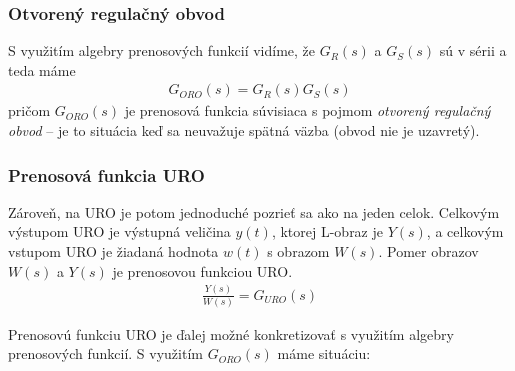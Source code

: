 \documentclass[a4paper, 10pt, ]{article}
\begin{document}
\subsubsection{Otvorený regulačný obvod}

S využitím algebry prenosových funkcií vidíme, že $G_R(s)$ a $G_S(s)$ sú v sérii a teda máme
\begin{align}
    G_{ORO}(s) = G_R(s) G_S(s)
\end{align}
pričom $G_{ORO}(s)$ je prenosová funkcia súvisiaca s pojmom \emph{otvorený regulačný obvod} -- je to situácia keď sa neuvažuje spätná väzba (obvod nie je uzavretý).

\begin{center}

    \vspace{-2mm}


    \vspace{-3mm}

	\label{schLinORO_basic.pdf}

\end{center}





\subsubsection{Prenosová funkcia URO}

Zároveň, na URO je potom jednoduché pozrieť sa ako na jeden celok. Celkovým výstupom URO je výstupná veličina $y(t)$, ktorej L-obraz je $Y(s)$, a celkovým vstupom URO je žiadaná hodnota $w(t)$ s obrazom $W(s)$. Pomer obrazov $W(s)$ a $Y(s)$ je prenosovou funkciou URO.
\begin{align}
    \frac{Y(s)}{W(s)} = G_{URO}(s)
\end{align}

Prenosovú funkciu URO je ďalej možné konkretizovať s využitím algebry prenosových funkcií. S využitím $G_{ORO}(s)$ máme situáciu:

\begin{center}

    \vspace{-1mm}


    \vspace{-1mm}

	\figcaption{}
	\label{schLinURO_basic_soro.pdf}

\end{center}
\end{document}
